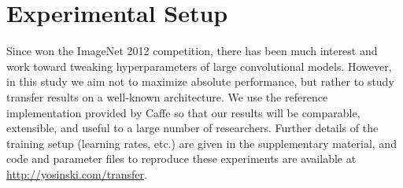 \section{Experimental Setup}

Since \cite{Krizhevsky-2012} won the ImageNet 2012 competition, there has been much interest and work toward tweaking hyperparameters of large convolutional models. However, in this study 
we aim not to maximize absolute performance, but rather to study transfer results on a well-known architecture.
We use the reference implementation provided by Caffe \citep{jia2014caffe:-convolutional-architecture}
so that our results will be comparable, extensible, and useful to a large number of researchers.
Further details of the training setup (learning rates, etc.) are given in the supplementary material, and code and parameter files to reproduce these experiments are available at \url{http://yosinski.com/transfer}.






